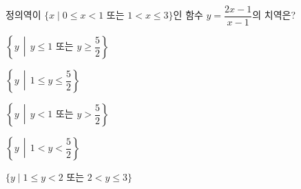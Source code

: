정의역이 $\{x \mid 0\le x<1$ 또는 $1<x\le 3\}$인 함수 $y=\dfrac{2x-1}{x-1}$의 치역은?
\begin{choicesii}{\rule[-3ex]{0pt}{8ex}$\left\{y \,\middle|\, y\le 1 \text{ 또는 } y\ge\dfrac{5}{2}\right\}$}{\rule[-3ex]{0pt}{8ex}$\left\{y \,\middle|\, 1\le y\le\dfrac{5}{2}\right\}$}{\rule[-3ex]{0pt}{8ex}$\left\{y \,\middle|\, y<1 \text{ 또는 } y>\dfrac{5}{2}\right\}$}{\rule[-3ex]{0pt}{8ex}$\left\{y \,\middle|\, 1<y<\dfrac{5}{2}\right\}$}{\rule[-3ex]{0pt}{8ex}$\{y \mid 1\le y<2$ 또는 $2<y\le 3\}$}\end{choicesii}
